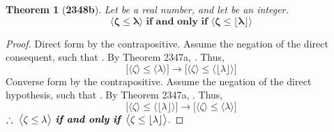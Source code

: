 \documentclass[preview]{standalone}
\newtheorem{theorem}{Theorem}
\begin{document}
\begin{theorem}[\textbf{2348b}]
    Let \bm{$\lambda$} be a real number, 
    and let \bm{$\zeta$} be an integer. 
    \begin{equation*}
        \bm{
        \big \langle \zeta \le \lambda \big \rangle
            \textbf{ if and only if }
        \big \langle \zeta \le \lfloor \lambda \rfloor \big \rangle}
    \end{equation*}
\end{theorem}

\begin{proof}
    Direct form by the contrapositive.
    Assume the negation of the direct consequent,
    such that \bm{$\zeta > \lfloor \lambda \rfloor$}.
    By Theorem 2347a, \bm{$\zeta > \lambda$}.
    Thus,
    \begin{equation*}
        \bigg[
            \Big \langle \zeta \Big \rangle
                \leq 
            \Big \langle \lambda \Big \rangle
        \bigg]
            \rightarrow 
        \bigg[
            \Big \langle \zeta \Big \rangle
                \leq 
            \Big \langle \lfloor \lambda \rfloor \Big \rangle
        \bigg]
    \end{equation*}
    Converse form by the contrapositive.
    Assume the negation of the direct hypothesis,
    such that \bm{$\zeta > \lambda$}.
    By Theorem 2347a, 
    \bm{$\zeta > \lfloor \lambda \rfloor$}.
    Thus,
    \begin{equation*}
        \bigg[
            \Big \langle \zeta \Big \rangle
                \leq 
            \Big \langle \lfloor \lambda \rfloor \Big \rangle
        \bigg]
            \rightarrow 
        \bigg[
            \Big \langle \zeta \Big \rangle
                \leq 
            \Big \langle \lambda \Big \rangle
        \bigg]
    \end{equation*}
    $\therefore \text{\space} \relax{
        \big \langle \zeta \le \lambda \big \rangle
            \textbf{ \emph{if and only if} }
        \big \langle \zeta \le \lfloor \lambda \rfloor \big \rangle}
    $.
\end{proof}
\end{document}
